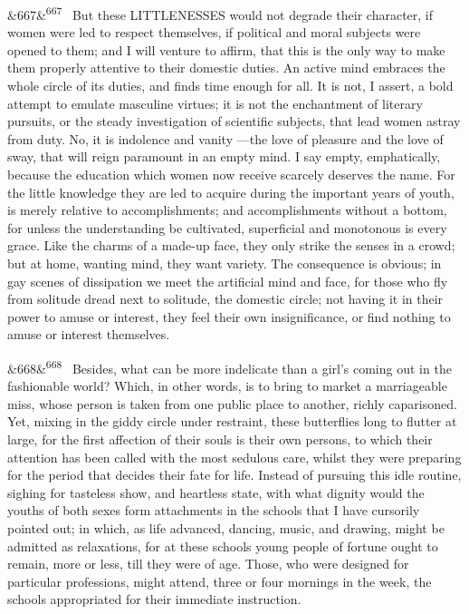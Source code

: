 \documentclass[12pt]{article}
\newcommand{\para}[1][]{\par\noindent\ifx&#1&\else\textsuperscript{\footnotesize #1}~\fi}
\begin{document}
\para[667] But these LITTLENESSES would not degrade their character, if women were led to respect themselves, if political and moral subjects were opened to them; and I will venture to affirm, that this is the only way to make them properly attentive to their domestic duties. An active mind embraces the whole circle of its duties, and finds time enough for all. It is not, I assert, a bold attempt to emulate masculine virtues; it is not the enchantment of literary pursuits, or the steady investigation of scientific subjects, that lead women astray from duty. No, it is indolence and vanity ---the love of pleasure and the love of sway, that will reign paramount in an empty mind. I say empty, emphatically, because the education which women now receive scarcely deserves the name. For the little knowledge they are led to acquire during the important years of youth, is merely relative to accomplishments; and accomplishments without a bottom, for unless the understanding be cultivated, superficial and monotonous is every grace. Like the charms of a made-up face, they only strike the senses in a crowd; but at home, wanting mind, they want variety. The consequence is obvious; in gay scenes of dissipation we meet the artificial mind and face, for those who fly from solitude dread next to solitude, the domestic circle; not having it in their power to amuse or interest, they feel their own insignificance, or find nothing to amuse or interest themselves.

\para[668] Besides, what can be more indelicate than a girl's coming out in the fashionable world? Which, in other words, is to bring to market a marriageable miss, whose person is taken from one public place to another, richly caparisoned. Yet, mixing in the giddy circle under restraint, these butterflies long to flutter at large, for the first affection of their souls is their own persons, to which their attention has been called with the most sedulous care, whilst they were preparing for the period that decides their fate for life. Instead of pursuing this idle routine, sighing for tasteless show, and heartless state, with what dignity would the youths of both sexes form attachments in the schools that I have cursorily pointed out; in which, as life advanced, dancing, music, and drawing, might be admitted as relaxations, for at these schools young people of fortune ought to remain, more or less, till they were of age. Those, who were designed for particular professions, might attend, three or four mornings in the week, the schools appropriated for their immediate instruction.
\end{document}
